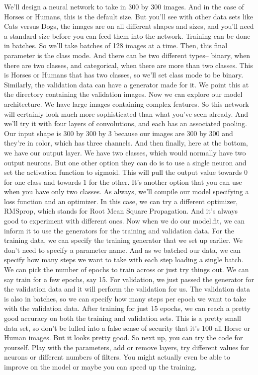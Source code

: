 We'll design a neural network to take in 300 by 300 images.
And in the case of Horses or Humans, this is the default size.
But you'll see with other data sets like Cats versus Dogs,
the images are on all different shapes and sizes,
and you'll need a standard size before you can feed them into the network.
Training can be done in batches.
So we'll take batches of 128 images at a time.
Then, this final parameter is the class mode.
And there can be two different types--
binary, when there are two classes, and categorical,
when there are more than two classes.
This is Horses or Humans that has two classes,
so we'll set class mode to be binary.
Similarly, the validation data can have a generator made for it.
We point this at the directory containing the validation images.
Now we can explore our model architecture.
We have large images containing complex features.
So this network will certainly look much more sophisticated
than what you've seen already.
And we'll try it with four layers of convolutions,
and each has an associated pooling.
Our input shape is 300 by 300 by 3 because our images are 300 by 300
and they're in color, which has three channels.
And then finally, here at the bottom, we have our output layer.
We have two classes, which would normally have two output neurons.
But one other option they can do is to use a single neuron
and set the activation function to sigmoid.
This will pull the output value towards 0 for one class and towards 1
for the other.
It's another option that you can use when you have only two classes.
As always, we'll compile our model specifying
a loss function and an optimizer.
In this case, we can try a different optimizer, RMSprop,
which stands for Root Mean Square Propagation.
And it's always good to experiment with different ones.
Now when we do our model.fit, we can inform
it to use the generators for the training and validation data.
For the training data, we can specify the training generator
that we set up earlier.
We don't need to specify a parameter name.
And as we batched our data, we can specify
how many steps we want to take with each step loading a single batch.
We can pick the number of epochs to train across or just try things out.
We can say train for a few epochs, say 15.
For validation, we just passed the generator for the validation data
and it will perform the validation for us.
The validation data is also in batches, so we
can specify how many steps per epoch we want to take with the validation data.
After training for just 15 epochs, we can reach a pretty good accuracy
on both the training and validation sets.
This is a pretty small data set, so don't
be lulled into a false sense of security that it's 100%
all Horse or Human images.
But it looks pretty good.
So next up, you can try the code for yourself.
Play with the parameters, add or remove layers,
try different values for neurons or different numbers of filters.
You might actually even be able to improve on the model
or maybe you can speed up the training.


